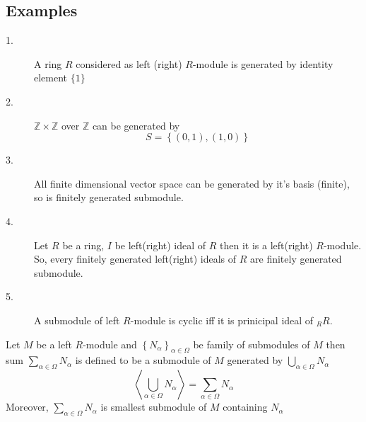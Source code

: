 \subsection{Examples}
\begin{description}
  \item[1.] A   ring $R$ considered as left (right) $R$-module is generated by identity element $\lbrace1\rbrace$

  \item[2.] $\mathbb{Z}\times \mathbb{Z}$  over $ \mathbb{Z}  $ can be generated by
  \[S =\left\lbrace(0,1),(1,0)\right\rbrace\]
  \item[3.] All finite dimensional vector space can be generated by it's basis (finite), so is finitely generated submodule.
  \item[4.] Let $R$ be a ring, $I$ be left(right) ideal of $R$ then it is a left(right) $R$-module. So, every  finitely  generated left(right) ideals of $R$ are finitely generated submodule.
  \item[5.] A submodule of left $R$-module is cyclic iff it is prinicipal ideal of $_RR$.
\end{description}
\bigskip
\begin{defn}
  Let $M$ be a left $R$-module and $\left\lbrace N_\alpha\right\rbrace_{\alpha \in \Omega }$  be family of submodules of $M$ then sum $\sum\limits_{\alpha \in \Omega } N_\alpha $ is defined to be a submodule of $M$ generated by $\bigcup\limits_{\alpha \in \Omega}N_\alpha $  \[\left\langle \bigcup_{\alpha \in \Omega}N_\alpha \right\rangle = \sum\limits_{\alpha \in \Omega } N_\alpha \] \bigskip
   Moreover, $\sum\limits_{\alpha \in \Omega } N_\alpha $ is smallest submodule of $M$ containing $N_\alpha $ 
  \end{defn} \bigskip
